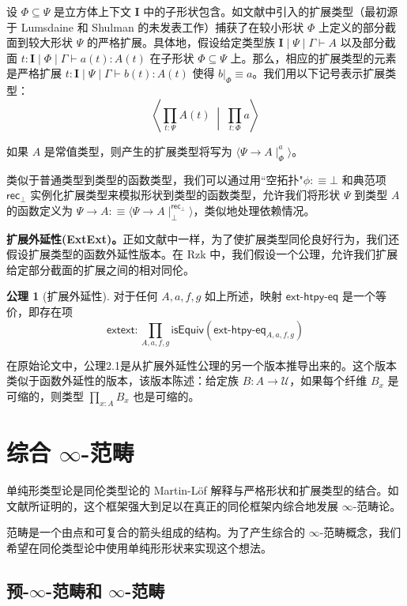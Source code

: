 \documentclass[12pt,a4paper]{article}
\theoremstyle{definition}
\theoremstyle{definition}
\newtheorem{axiom}[theorem]{公理}
\begin{document}
设 $\Phi \subseteq \Psi$ 是立方体上下文 $\mathbf{I}$ 中的子形状包含。如文献中引入的扩展类型（最初源于 Lumsdaine 和 Shulman 的未发表工作）捕获了在较小形状 $\Phi$ 上定义的部分截面到较大形状 $\Psi$ 的严格扩展。具体地，假设给定类型族 $\mathbf{I} \mid \Psi \mid \Gamma \vdash A$ 以及部分截面 $t:\mathbf{I} \mid \Phi \mid \Gamma \vdash a(t):A(t)$ 在子形状 $\Phi \subseteq \Psi$ 上。那么，相应的扩展类型的元素是严格扩展 $t:\mathbf{I} \mid \Psi \mid \Gamma \vdash b(t):A(t)$ 使得 $b|_\Phi \equiv a$。我们用以下记号表示扩展类型：
\[
\left\langle \prod_{t:\Psi} A(t) \; \middle| \; \prod_{t:\Phi} a \right\rangle
\]

如果 $A$ 是常值类型，则产生的扩展类型将写为 $\langle \Psi \to A \mid_\Phi^a \rangle$。

类似于普通类型到类型的函数类型，我们可以通过用``空拓扑"$\phi:\equiv \bot$ 和典范项 $\mathsf{rec}_\bot$ 实例化扩展类型来模拟形状到类型的函数类型，允许我们将形状 $\Psi$ 到类型 $A$ 的函数定义为 $\Psi \to A :\equiv \langle \Psi \to A \mid_\bot^{\mathsf{rec}_\bot} \rangle$，类似地处理依赖情况。

\textbf{扩展外延性(ExtExt)。}正如文献中一样，为了使扩展类型同伦良好行为，我们还假设扩展类型的函数外延性版本。在 Rzk 中，我们假设一个公理，允许我们扩展给定部分截面的扩展之间的相对同伦。

\begin{axiom}[扩展外延性]
对于任何 $A, a, f, g$ 如上所述，映射 $\mathsf{ext\text{-}htpy\text{-}eq}$ 是一个等价，即存在项
\[
\mathsf{extext} : \prod_{A,a,f,g} \mathsf{isEquiv}(\mathsf{ext\text{-}htpy\text{-}eq}_{A,a,f,g})
\]
\end{axiom}

在原始论文中，公理2.1是从扩展外延性公理的另一个版本推导出来的。这个版本类似于函数外延性的版本，该版本陈述：给定族 $B:A \to \mathcal{U}$，如果每个纤维 $B_x$ 是可缩的，则类型 $\prod_{x:A} B_x$ 也是可缩的。

\section{综合 $\infty$-范畴}

单纯形类型论是同伦类型论的 Martin-L\"of 解释与严格形状和扩展类型的结合。如文献所证明的，这个框架强大到足以在真正的同伦框架内综合地发展 $\infty$-范畴论。

范畴是一个由点和可复合的箭头组成的结构。为了产生综合的 $\infty$-范畴概念，我们希望在同伦类型论中使用单纯形形状来实现这个想法。

\subsection{预-$\infty$-范畴和 $\infty$-范畴}
\end{document}
